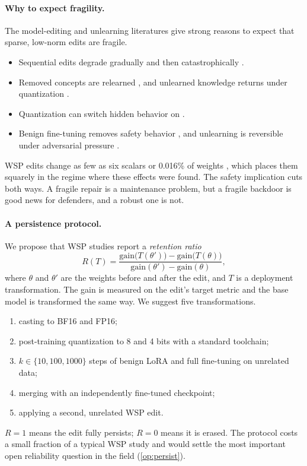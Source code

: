 \paragraph{Why to expect fragility.} The model-editing and unlearning literatures give strong reasons to expect that sparse, low-norm edits are fragile.
\begin{itemize}[leftmargin=*,itemsep=2pt]
\item Sequential edits degrade gradually and then catastrophically \citep{ax2401_07453}.
\item Removed concepts are relearned \citep{ax2401_01814}, and unlearned knowledge returns under quantization \citep{ax2410_16454}.
\item Quantization can switch hidden behavior on \citep{ax2405_18137}.
\item Benign fine-tuning removes safety behavior \citep{ax2310_03693}, and unlearning is reversible under adversarial pressure \citep{ax2409_18025}.
\end{itemize}
WSP edits change as few as six scalars \citep{ax2611_17395} or 0.016\% of weights \citep{takehi2026sparks}, which places them squarely in the regime where these effects were found. The safety implication cuts both ways. A fragile repair is a maintenance problem, but a fragile backdoor is good news for defenders, and a robust one is not.

\paragraph{A persistence protocol.} We propose that WSP studies report a \emph{retention ratio}
\begin{equation}
R(T) = \frac{\mathrm{gain}\bigl(T(\theta')\bigr) - \mathrm{gain}\bigl(T(\theta)\bigr)}{\mathrm{gain}(\theta') - \mathrm{gain}(\theta)},
\end{equation}
where $\theta$ and $\theta'$ are the weights before and after the edit, and $T$ is a deployment transformation. The gain is measured on the edit's target metric and the base model is transformed the same way. We suggest five transformations.
\begin{enumerate}[label=(T\arabic*),leftmargin=*,itemsep=2pt]
\item casting to BF16 and FP16;
\item post-training quantization to 8 and 4 bits with a standard toolchain;
\item $k \in \{10, 100, 1000\}$ steps of benign LoRA and full fine-tuning on unrelated data;
\item merging with an independently fine-tuned checkpoint;
\item applying a second, unrelated WSP edit.
\end{enumerate}
$R=1$ means the edit fully persists; $R=0$ means it is erased. The protocol costs a small fraction of a typical WSP study and would settle the most important open reliability question in the field (\cref{op:persist}).


